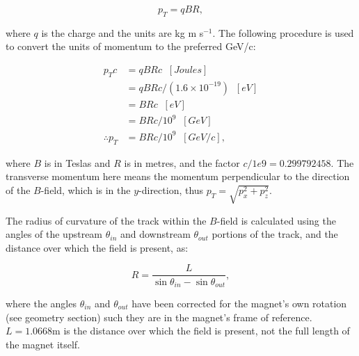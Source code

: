\begin{equation}
p_T = qBR,
\end{equation}

where $q$ is the charge and the units are kg m s$^{-1}$.  The following procedure is used to convert the units of momentum to the preferred GeV/c:

\begin{equation}
\begin{split}
p_Tc &= qBRc \;\; \unit{[Joules]} \\
 &= qBRc/(1.6\times10^{-19})\;\; \unit{[eV]}  \\                                                                                                                                                                   
 &= BRc \;\; \unit{[eV]}  \\         
  &= BRc/10^9 \;\; \unit{[GeV]}  \\                                                                                                                                                                                                                                                                                                                                           \therefore p_T &= BR c/10^9\;\; \unit{[GeV/c]} , 
\end{split}                                                                                                                                                                
\end{equation}

where $B$ is in Teslas and $R$ is in metres, and the factor $c/1e9 = 0.299792458$. The transverse momentum here means the momentum perpendicular to the direction of the $B$-field, which is in the $y$-direction, thus $p_T = \sqrt{ p_x^2 + p_z^2}$.

The radius of curvature of the track within the $B$-field is calculated using the angles of the upstream $\theta_{in}$ and downstream $\theta_{out}$ portions of the track, and the distance over which the field is present, as:

\begin{equation}
R = \frac{ L }{\sin{\theta_{in}} - \sin{\theta_{out}} },
\end{equation}
 
 where the angles $\theta_{in}$ and  $\theta_{out}$ have been corrected for the magnet's own rotation (see geometry section) such they are in the magnet's frame of reference.  $L =1.0668$m is the distance over which the field is present, not the full length of the magnet itself.
 
